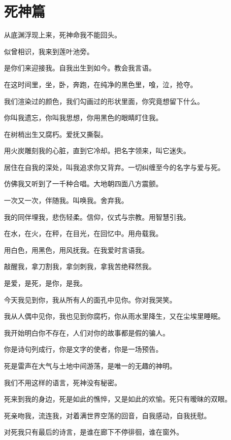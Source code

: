 \documentclass[UTF8]{article}
\begin{document}
\section{死神篇}
\par 从底渊浮现上来，死神命我不能回头。
\par 似曾相识，我来到莲叶池旁。
\par 是你们来迎接我。自我出生到如今。教会我言语。
\par 在这时间里，坐，卧，奔跑，在纯净的黑色里，喰，泣，抢夺。
\par 我们渲染过的颜色，我们勾画过的形状里面，你究竟想留下什么。
\par 你叫我遗忘，你叫我思想，你用黑色的眼睛盯住我。
\par 在树梢出生又腐朽。爱抚又撕裂。
\par 用火炭雕刻我的心脏，直到它冷却。把名字领来，叫它迷失。
\par 居住在自我的深处，叫我追求你又背弃。一切纠缠至今的名字与爱与死。
\par 仿佛我又听到了一千种合唱。大地朝四面八方震颤。
\\[0.6cm]
\par 一次又一次，伴随我。叫唤我。舍弃我。
\par 我的同伴埋我，悲伤轻柔。信仰，仪式与宗教。用智慧引我。
\par 在水，在火，在秤，在目光，在回忆中。用舟载我。
\par 用白色，用黑色，用风抚我。在我爱时言语我。
\par 敲醒我，拿刀割我，拿剑刺我，拿我苦绝释然我。
\par 是爱，是死，是你，是我。
\\[0.6cm]
\par 今天我见到你，我从所有人的面孔中见你。你对我哭笑。
\par 我从人偶中见你，我也见到你腐朽，你从雨水里降生，又在尘埃里睡眠。
\par 我开始明白你不存在，人们对你的故事都是假的骗人。
\par 你是诗句列成行，你是文字的使者，你是一场预告。
\par 死是雷声在大气与土地中间游荡，是唯一的无趣的神明。
\par 我们不用这样的语言，死神没有秘密。
\par 死来到我的身边，死是如此的憔悴，又是如此的欢愉。死只有暧昧的双眼。
\par 死亲吻我，流连我，对着满世界空荡的回音，自我感动，自我抚慰。
\par 对死我只有最后的诗言，是谁在廊下不停徘徊，谁在窗外。
\end{document}
